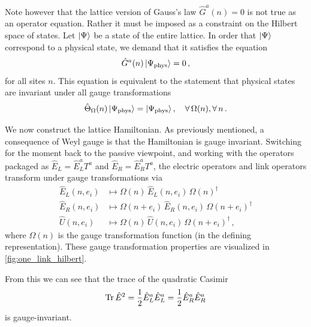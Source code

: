 \documentclass[reprint,superscriptaddress,pra,nofootinbib,preprintnumbers,floatfix]{revtex4-1}
\begin{document}
Note however that the lattice version of Gauss's law $\hat{G}^a(n) = 0$ is not true as an operator equation. 
%
Rather it must be imposed as a constraint on the Hilbert space of states. 
%
Let $\ket{\Psi}$ be a state of the entire lattice. 
%
In order that $\ket{\Psi}$ correspond to a physical state, we demand that it satisfies the equation
%
\begin{equation}\label{eq:gauss_law}
    \hat{G}^{a}(n) \ket{\Psi_\text{phys}} = 0 \,,
\end{equation}
%
for all sites $n$. This equation is equivalent to the statement that physical states are invariant under all gauge transformations
\begin{equation}
    \hat{\Theta}_\Omega(n) \ket{\Psi_\text{phys}} = \ket{\Psi_\text{phys}} \qc
      \forall\, \Omega(n), \forall\, n \,.
\end{equation}



We now construct the lattice Hamiltonian. 
%
As previously mentioned, a consequence of Weyl gauge is that the Hamiltonian is gauge invariant.
%
Switching for the moment back to the passive viewpoint, and working with the operators packaged as $\hat{E}_L = \hat{E}^a_L T^a$ and $\hat{E}_R = \hat{E}_R^a T^a$, the electric operators and link operators transform under gauge transformations via
%
\begin{align}
    \hat{E}_L(n,e_i) &\longmapsto \Omega(n) \, \hat{E}_L(n,e_i) \, \Omega(n)^\dagger \\[10pt]
    \hat{E}_R(n,e_i) &\longmapsto \Omega(n+e_i) \, \hat{E}_R(n,e_i)  \, \Omega(n+e_i)^\dagger \\[10pt]
      \label{eq:U_gauge_trans}
    \hat{U}(n,e_i) &\longmapsto \Omega(n) \, \hat{U}(n,e_i) \, \Omega(n+e_i)^\dagger \,,
\end{align}
where $\Omega(n)$ is the gauge transformation function (in the defining representation). These gauge transformation properties are visualized in \cref{fig:one_link_hilbert}.



From this we can see that the trace of the quadratic Casimir 
%
\begin{equation}
    \Tr\hat{E}^2 = \frac{1}{2} \hat{E}_L^a \hat{E}_L^a = \frac{1}{2} \hat E_R^a \hat{E}_R^a
\end{equation} 
%
is gauge-invariant. 
\end{document}

